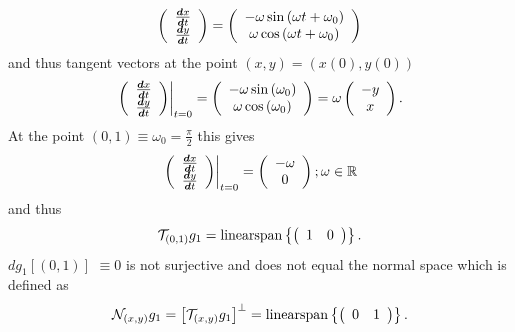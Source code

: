 \documentclass[aps,preprint]{revtex4}%
\begin{document}
\begin{equation}
\left(
\begin{array}
[c]{c}%
\frac{\boldsymbol{d}x}{\boldsymbol{d}t}\\
\frac{\boldsymbol{d}y}{\boldsymbol{d}t}%
\end{array}
\right)  =\left(
\begin{array}
[c]{c}%
-\omega\sin\left(  \omega t+\omega_{0}\right) \\
\omega\cos\left(  \omega t+\omega_{0}\right)
\end{array}
\right)
\end{equation}
and thus tangent vectors at the point $\left(  x,y\right)  =\left(  x\left(
0\right)  ,y\left(  0\right)  \right)  $
\begin{equation}
\left.  \left(
\begin{array}
[c]{c}%
\frac{\boldsymbol{d}x}{\boldsymbol{d}t}\\
\frac{\boldsymbol{d}y}{\boldsymbol{d}t}%
\end{array}
\right)  \right\vert _{t=0}=\left(
\begin{array}
[c]{c}%
-\omega\sin\left(  \omega_{0}\right) \\
\omega\cos\left(  \omega_{0}\right)
\end{array}
\right)  =\omega\left(
\begin{array}
[c]{c}%
-y\\
x
\end{array}
\right)  .
\end{equation}
At the point $\left(  0,1\right)  \equiv\omega_{0}=\frac{\pi}{2}$ this gives
\begin{equation}
\left.  \left(
\begin{array}
[c]{c}%
\frac{\boldsymbol{d}x}{\boldsymbol{d}t}\\
\frac{\boldsymbol{d}y}{\boldsymbol{d}t}%
\end{array}
\right)  \right\vert _{t=0}=\left(
\begin{array}
[c]{c}%
-\omega\\
0
\end{array}
\right)  ;\omega\in\mathbb{R}%
\end{equation}
and thus
\begin{equation}
\mathcal{T}_{\left(  0,1\right)  }g_{1}=\operatorname*{linearspan}\left\{
\left(
\begin{array}
[c]{cc}%
1 & 0
\end{array}
\right)  \right\}  .
\end{equation}
$dg_{1}\left[  \left(  0,1\right)  \right]  $ $\equiv0$ is not surjective and
does not equal the normal space which is defined as
\begin{equation}
\mathcal{N}_{\left(  x,y\right)  }g_{1}=\left[  \mathcal{T}_{\left(
x,y\right)  }g_{1}\right]  ^{\bot}=\operatorname*{linearspan}\left\{  \left(
\begin{array}
[c]{cc}%
0 & 1
\end{array}
\right)  \right\}  .
\end{equation}
\end{document}
